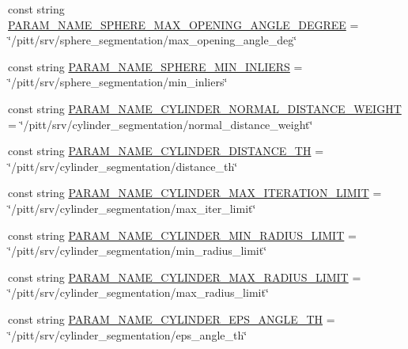 \begin{DoxyCompactItemize}
const string \hyperlink{namespacesrvm_ae8a655418ddc4f96bc9a13d245a5dafb}{P\-A\-R\-A\-M\-\_\-\-N\-A\-M\-E\-\_\-\-S\-P\-H\-E\-R\-E\-\_\-\-M\-A\-X\-\_\-\-O\-P\-E\-N\-I\-N\-G\-\_\-\-A\-N\-G\-L\-E\-\_\-\-D\-E\-G\-R\-E\-E} = \char`\"{}/pitt/srv/sphere\-\_\-segmentation/max\-\_\-opening\-\_\-angle\-\_\-deg\char`\"{}
\item 
const string \hyperlink{namespacesrvm_a3c779659d33a4785a807abe53c2bf52f}{P\-A\-R\-A\-M\-\_\-\-N\-A\-M\-E\-\_\-\-S\-P\-H\-E\-R\-E\-\_\-\-M\-I\-N\-\_\-\-I\-N\-L\-I\-E\-R\-S} = \char`\"{}/pitt/srv/sphere\-\_\-segmentation/min\-\_\-inliers\char`\"{}
\item 
const string \hyperlink{namespacesrvm_a09193d91d1605cb57a465191c5c76937}{P\-A\-R\-A\-M\-\_\-\-N\-A\-M\-E\-\_\-\-C\-Y\-L\-I\-N\-D\-E\-R\-\_\-\-N\-O\-R\-M\-A\-L\-\_\-\-D\-I\-S\-T\-A\-N\-C\-E\-\_\-\-W\-E\-I\-G\-H\-T} = \char`\"{}/pitt/srv/cylinder\-\_\-segmentation/normal\-\_\-distance\-\_\-weight\char`\"{}
\item 
const string \hyperlink{namespacesrvm_a5c4d574f82749332080a69b24f701293}{P\-A\-R\-A\-M\-\_\-\-N\-A\-M\-E\-\_\-\-C\-Y\-L\-I\-N\-D\-E\-R\-\_\-\-D\-I\-S\-T\-A\-N\-C\-E\-\_\-\-T\-H} = \char`\"{}/pitt/srv/cylinder\-\_\-segmentation/distance\-\_\-th\char`\"{}
\item 
const string \hyperlink{namespacesrvm_a6014be265a0226940dadfd3dbab61ddd}{P\-A\-R\-A\-M\-\_\-\-N\-A\-M\-E\-\_\-\-C\-Y\-L\-I\-N\-D\-E\-R\-\_\-\-M\-A\-X\-\_\-\-I\-T\-E\-R\-A\-T\-I\-O\-N\-\_\-\-L\-I\-M\-I\-T} = \char`\"{}/pitt/srv/cylinder\-\_\-segmentation/max\-\_\-iter\-\_\-limit\char`\"{}
\item 
const string \hyperlink{namespacesrvm_ab1881c1282b48afac271ea14a806c34f}{P\-A\-R\-A\-M\-\_\-\-N\-A\-M\-E\-\_\-\-C\-Y\-L\-I\-N\-D\-E\-R\-\_\-\-M\-I\-N\-\_\-\-R\-A\-D\-I\-U\-S\-\_\-\-L\-I\-M\-I\-T} = \char`\"{}/pitt/srv/cylinder\-\_\-segmentation/min\-\_\-radius\-\_\-limit\char`\"{}
\item 
const string \hyperlink{namespacesrvm_a85b64ea120e2c925a89075ad4efce82a}{P\-A\-R\-A\-M\-\_\-\-N\-A\-M\-E\-\_\-\-C\-Y\-L\-I\-N\-D\-E\-R\-\_\-\-M\-A\-X\-\_\-\-R\-A\-D\-I\-U\-S\-\_\-\-L\-I\-M\-I\-T} = \char`\"{}/pitt/srv/cylinder\-\_\-segmentation/max\-\_\-radius\-\_\-limit\char`\"{}
\item 
const string \hyperlink{namespacesrvm_a7e9ad3e08d4a3bca5694b38a5fb4a3f7}{P\-A\-R\-A\-M\-\_\-\-N\-A\-M\-E\-\_\-\-C\-Y\-L\-I\-N\-D\-E\-R\-\_\-\-E\-P\-S\-\_\-\-A\-N\-G\-L\-E\-\_\-\-T\-H} = \char`\"{}/pitt/srv/cylinder\-\_\-segmentation/eps\-\_\-angle\-\_\-th\char`\"{}
\item 

\end{DoxyCompactItemize}
